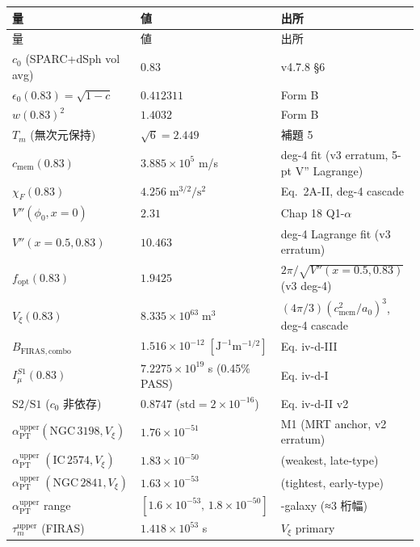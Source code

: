 \documentclass[11pt,a4paper]{ltjsarticle}
\newcommand{\epso}{\epsilon_0}
\newcommand{\cmem}{c_{\mathrm{mem}}}
\newcommand{\Vxi}{V_{\xi}}
\newcommand{\Tm}{T_{m}}
\newcommand{\aPT}{\alpha_{\mathrm{PT}}}
\newcommand{\taum}{\tau_{m}}
\newcommand{\Imu}{I_{\mu}}
\newcommand{\BFIRAS}{B_{\mathrm{FIRAS,combo}}}
\newcommand{\Lambdauv}{\Lambda_{\mathrm{UV}}}
\newcommand{\fopt}{f_{\mathrm{opt}}}
\begin{document}
\begin{center}\small
\begin{longtable}{@{}>{\raggedright\arraybackslash}p{43mm}>{\raggedright\arraybackslash}p{53mm}>{\raggedright\arraybackslash}p{60mm}@{}}
\toprule
量 & 値 & 出所 \\
\midrule\endfirsthead
\toprule
量 & 値 & 出所 \\
\midrule\endhead
$c_0$ (SPARC+dSph vol avg) & $0.83$ & v4.7.8 \S 6 \\
$\epso(0.83) = \sqrt{1 - c}$ & $0.412311$ & Form B \\
$w(0.83)^2$ & $1.4032$ & Form B \\
$\Tm$ (無次元保持) & $\sqrt{6} = 2.449$ & 補題 5~\citep{v4.7.6internal} \\
$\cmem(0.83)$ & $3.885 \times 10^{5}$ m/s & deg-4 fit (v3 erratum, 5-pt V'' Lagrange) \\
$\chi_F(0.83)$ & $4.256\;\mathrm{m}^{3/2}/\mathrm{s}^2$ & Eq.~2A-II, deg-4 cascade \\
$V''(\phi_0, x=0)$ & $2.31$ & Chap 18 Q1-$\alpha$ \\
$V''(x=0.5, 0.83)$ & $10.463$ & deg-4 Lagrange fit (v3 erratum) \\
$\fopt(0.83)$ & $1.9425$ & $2\pi/\sqrt{V''(x=0.5,0.83)}$ (v3 deg-4) \\
$\Vxi(0.83)$ & $8.335 \times 10^{63}\;\mathrm{m}^3$ & $(4\pi/3)(\cmem^2/a_0)^3$, deg-4 cascade \\
$\BFIRAS$ & $1.516 \times 10^{-12}\;[\mathrm{J}^{-1}\mathrm{m}^{-1/2}]$ & Eq. iv-d-III \\
$\Imu^{S1}(0.83)$ & $7.2275 \times 10^{19}$ s (0.45\% PASS) & Eq. iv-d-I \\
$\mathrm{S2/S1}$ ($c_0$ 非依存) & $0.8747$ ($\mathrm{std} = 2 \times 10^{-16}$) & Eq. iv-d-II v2 \\
$\aPT^{\mathrm{upper}}(\mathrm{NGC\,3198}, \Vxi)$ & $1.76 \times 10^{-51}$ & M1 (MRT anchor, v2 erratum) \\
$\aPT^{\mathrm{upper}}\;(\mathrm{IC\,2574}, \Vxi)$ & $1.83 \times 10^{-50}$ & (weakest, late-type) \\
$\aPT^{\mathrm{upper}}\;(\mathrm{NGC\,2841}, \Vxi)$ & $1.63 \times 10^{-53}$ & (tightest, early-type) \\
$\aPT^{\mathrm{upper}}$ range & $[1.6\times10^{-53},\, 1.8\times10^{-50}]$ & 3-galaxy (≈3 桁幅) \\
$\taum^{\mathrm{upper}}$ (FIRAS) & $1.418 \times 10^{53}$ s & $\Vxi$ primary \\

\end{longtable}
\end{center}
\end{document}
